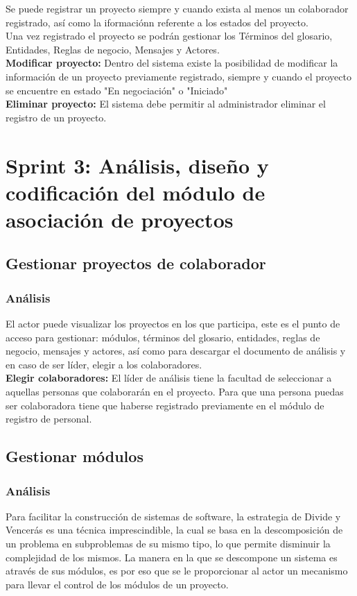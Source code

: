 Se puede registrar un proyecto siempre y cuando exista al menos un colaborador registrado, así como la iformaciónn referente a los estados del proyecto.\\

Una vez registrado el proyecto se podrán gestionar los Términos del glosario, Entidades, Reglas de negocio, Mensajes y Actores.\\

\textbf {Modificar proyecto:}
Dentro del sistema existe la posibilidad de modificar la información de un proyecto previamente registrado, siempre y cuando el proyecto se encuentre en estado "En negociación" o "Iniciado"\\

\textbf {Eliminar proyecto:}
El sistema debe permitir al administrador eliminar el registro de un proyecto.\\



\section{Sprint 3: Análisis, diseño y codificación del módulo de asociación de proyectos}
\subsection{Gestionar proyectos de colaborador}
\subsubsection {Análisis}
El actor puede visualizar los proyectos en los que participa, este es el punto de acceso para gestionar: módulos, términos del glosario, entidades, reglas de negocio, mensajes y actores, así como para descargar el documento de análisis y en caso de ser líder, elegir a los colaboradores.\\

\textbf {Elegir colaboradores:} El líder de análisis tiene la facultad de seleccionar a aquellas personas que colaborarán en el proyecto. Para que una persona puedas ser colaboradora tiene que haberse registrado previamente en el módulo de registro de personal.\\


\subsection{Gestionar módulos}

\subsubsection {Análisis}
Para facilitar la construcción de sistemas de software, la estrategia de Divide y Vencerás es una técnica imprescindible, la cual se basa en la descomposición de un problema en subproblemas de su mismo tipo, lo que permite disminuir la complejidad de los mismos. La manera en la que se descompone un sistema es através de sus módulos, es por eso que se le proporcionar al actor un mecanismo para llevar el control de los módulos de un proyecto. \\

